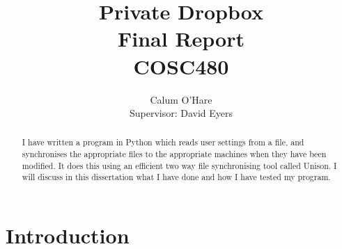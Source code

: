 \documentclass[12pt]{article}
\title{ Private Dropbox \\ Final Report \\ COSC480}
\author{Calum O'Hare \\ Supervisor: David Eyers}
\date{}
\begin{document}
\maketitle

\newpage
\begin{abstract}
I have written a program in Python which reads user
settings from a file, and synchronises the appropriate files
to the appropriate machines when they have been modified.
It does this using an efficient two way file synchronising tool called
Unison. I will discuss in this dissertation what I have done and
how I have tested my program.
\end{abstract}
\newpage

\tableofcontents
\newpage

\section{Introduction}
\end{document}
